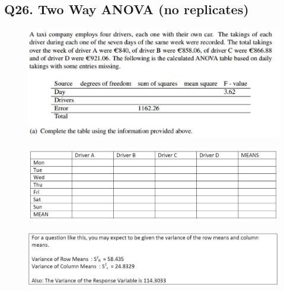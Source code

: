 \documentclass[a4paper,12pt]{article}
\begin{document}
\subsection*{Q26. Two Way ANOVA (no replicates)}
\begin{figure}[h!]
	\centering
	\includegraphics[width=0.8\linewidth]{images/Q26Review1}
	
\end{figure}
\begin{figure}[h!]
	\centering
	\includegraphics[width=0.8\linewidth]{images/Q26review2}
	
\end{figure}
\begin{figure}[h!]
	\centering
	\includegraphics[width=0.8\linewidth]{images/Q26review3}
	
\end{figure}
\newpage
\end{document}
